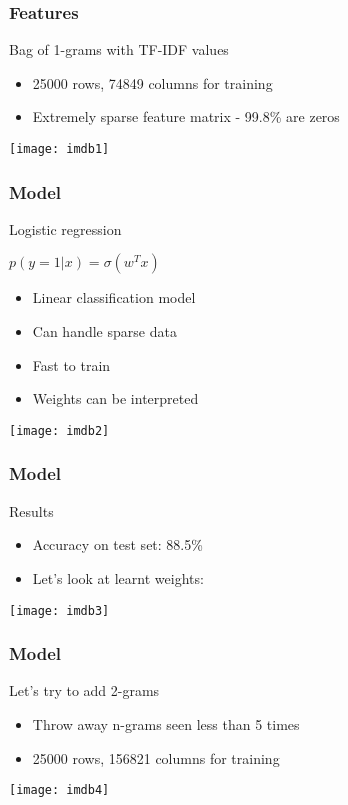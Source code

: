 \begin{frame}[fragile]\frametitle{Features}
Bag of 1-grams with TF-IDF values
  \begin{itemize}
\item 25000 rows, 74849 columns for training
\item Extremely sparse feature matrix - 99.8\% are zeros
  \end{itemize}
  
  
\begin{center}
\texttt{[image: imdb1]}
\end{center}
\end{frame}


\begin{frame}[fragile]\frametitle{Model}
Logistic regression

$p(y=1|x) = \sigma (w^T x)$
  \begin{itemize}
\item Linear classification model
\item Can handle sparse data
\item Fast to train
\item Weights can be interpreted
  \end{itemize}

\begin{center}
\texttt{[image: imdb2]}
\end{center}
\end{frame}

\begin{frame}[fragile]\frametitle{Model}
Results

\begin{itemize}
\item Accuracy on test set: 88.5\%
\item  Let's look at learnt weights:
  \end{itemize}

\begin{center}
\texttt{[image: imdb3]}
\end{center}
\end{frame}


\begin{frame}[fragile]\frametitle{Model}
Let's try to add 2-grams

\begin{itemize}
\item Throw away n-grams seen less than 5 times
\item 25000 rows, 156821 columns for training
  \end{itemize}

\begin{center}
\texttt{[image: imdb4]}
\end{center}
\end{frame}

